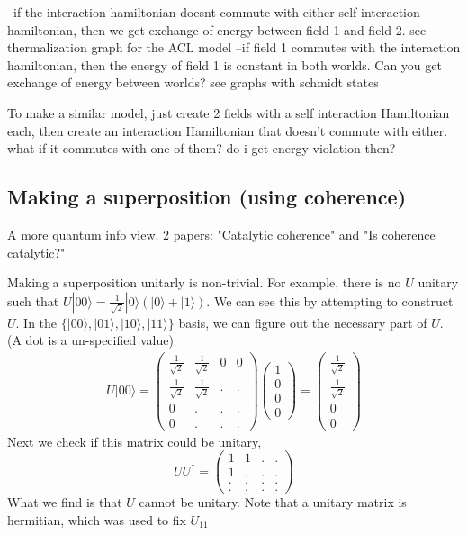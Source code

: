 \documentclass{article}
\begin{document}
--if the interaction hamiltonian doesnt commute with either self interaction hamiltonian, then we get exchange of energy between field 1 and field 2. see thermalization graph for the ACL model
--if field 1 commutes with the interaction hamiltonian, then the energy of field 1 is constant in both worlds. Can you get exchange of energy between worlds? see graphs with schmidt states

To make a similar model, just create 2 fields with a self interaction Hamiltonian each, then create an interaction Hamiltonian that doesn't commute with either. what if it commutes with one of them? do i get energy violation then?

\subsection{Making a superposition (using coherence)}
A more quantum info view. 2 papers: "Catalytic coherence" and "Is coherence catalytic?"

Making a superposition unitarly is non-trivial. For example, there is no $U$ unitary such that $U|00\rangle=\frac{1}{\sqrt{2}}|0\rangle(|0\rangle+|1\rangle)$. We can see this by attempting to construct $U$. In the $\{|00\rangle,|01\rangle,|10\rangle,|11\rangle\}$ basis, we can figure out the necessary part of $U$. (A dot is a un-specified value)
\begin{align}
    U|00\rangle=
    \begin{pmatrix}
        \frac{1}{\sqrt{2}} & \frac{1}{\sqrt{2}} & 0 & 0\\
        \frac{1}{\sqrt{2}} & \frac{1}{\sqrt{2}} & . & .\\
        0 & . & . & .\\
        0 & . & . & .
    \end{pmatrix}
    \begin{pmatrix}
        1\\
        0\\
        0\\
        0
    \end{pmatrix}
    =
    \begin{pmatrix}
        \frac{1}{\sqrt{2}}\\
        \frac{1}{\sqrt{2}}\\
        0\\
        0
    \end{pmatrix}
\end{align}
Next we check if this matrix could be unitary,
\begin{equation}
    UU^{\dagger}=
    \begin{pmatrix}
        1 & 1 & . & .\\
        1 & . & . & .\\
        . & . & . & .\\
        . & . & . & .
    \end{pmatrix}
\end{equation}
What we find is that $U$ cannot be unitary.
Note that a unitary matrix is hermitian, which was used to fix $U_{11}$
\end{document}
